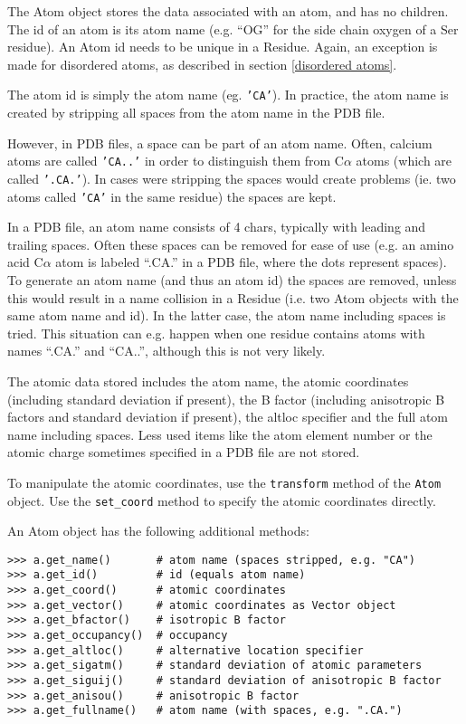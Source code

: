 The Atom object stores the data associated with an atom, and has no children.
The id of an atom is its atom name (e.g. ``OG'' for the side chain oxygen
of a Ser residue). An Atom id needs to be unique in a Residue. Again, an exception is made for disordered atoms, as described in section \ref{disordered atoms}.

The atom id is simply the atom name (eg. \texttt{'CA'}). In practice,
the atom name is created by stripping all spaces from the atom name
in the PDB file.

However, in PDB files, a space can be part of an atom name. Often,
calcium atoms are called \texttt{'CA..'} in order to distinguish them
from C$\alpha$ atoms (which are called \texttt{'.CA.'}). In cases
were stripping the spaces would create problems (ie. two atoms called
\texttt{'CA'} in the same residue) the spaces are kept.

In a PDB file, an atom name consists of 4 chars, typically with leading and
trailing spaces. Often these spaces can be removed for ease of use (e.g. an
amino acid C\( \alpha  \) atom is labeled ``.CA.'' in a PDB file, where
the dots represent spaces). To generate an atom name (and thus an atom id) the
spaces are removed, unless this would result in a name collision in a Residue
(i.e. two Atom objects with the same atom name and id). In the latter case,
the atom name including spaces is tried. This situation can e.g. happen when
one residue contains atoms with names ``.CA.'' and ``CA..'', although
this is not very likely.

The atomic data stored includes the atom name, the atomic coordinates (including
standard deviation if present), the B factor (including anisotropic B factors
and standard deviation if present), the altloc specifier and the full atom name
including spaces. Less used items like the atom element number or the atomic
charge sometimes specified in a PDB file are not stored.

To manipulate the atomic coordinates, use the \texttt{transform} method of
the \texttt{Atom} object. Use the \texttt{set\_coord} method to specify the
atomic coordinates directly.

An Atom object has the following additional methods:

\begin{verbatim}
>>> a.get_name()       # atom name (spaces stripped, e.g. "CA")
>>> a.get_id()         # id (equals atom name)
>>> a.get_coord()      # atomic coordinates
>>> a.get_vector()     # atomic coordinates as Vector object
>>> a.get_bfactor()    # isotropic B factor
>>> a.get_occupancy()  # occupancy
>>> a.get_altloc()     # alternative location specifier
>>> a.get_sigatm()     # standard deviation of atomic parameters
>>> a.get_siguij()     # standard deviation of anisotropic B factor
>>> a.get_anisou()     # anisotropic B factor
>>> a.get_fullname()   # atom name (with spaces, e.g. ".CA.")
\end{verbatim}

